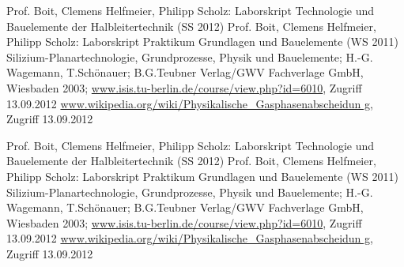 \begin{thebibliography}{999}




 Prof. Boit, Clemens Helfmeier, Philipp Scholz: Laborskript
Technologie und Bauelemente der Halbleitertechnik (SS 2012)
 Prof. Boit, Clemens Helfmeier, Philipp Scholz: Laborskript
Praktikum Grundlagen und Bauelemente (WS 2011)
 Silizium-Planartechnologie, Grundprozesse, Physik und
Bauelemente; H.-G. Wagemann, T.Schönauer; B.G.Teubner Verlag/GWV Fachverlage
GmbH, Wiesbaden 2003;
 \url{www.isis.tu-berlin.de/course/view.php?id=6010}, Zugriff
13.09.2012
 \url{www.wikipedia.org/wiki/Physikalische_Gasphasenabscheidun
g}, Zugriff 13.09.2012
\end{thebibliography}



\newpage

\begin{thebibliography}{999}




 Prof. Boit, Clemens Helfmeier, Philipp Scholz: Laborskript
Technologie und Bauelemente der Halbleitertechnik (SS 2012)
 Prof. Boit, Clemens Helfmeier, Philipp Scholz: Laborskript
Praktikum Grundlagen und Bauelemente (WS 2011)
 Silizium-Planartechnologie, Grundprozesse, Physik und
Bauelemente; H.-G. Wagemann, T.Schönauer; B.G.Teubner Verlag/GWV Fachverlage
GmbH, Wiesbaden 2003;
 \url{www.isis.tu-berlin.de/course/view.php?id=6010}, Zugriff
13.09.2012
 \url{www.wikipedia.org/wiki/Physikalische_Gasphasenabscheidun
g}, Zugriff 13.09.2012
\end{thebibliography}






